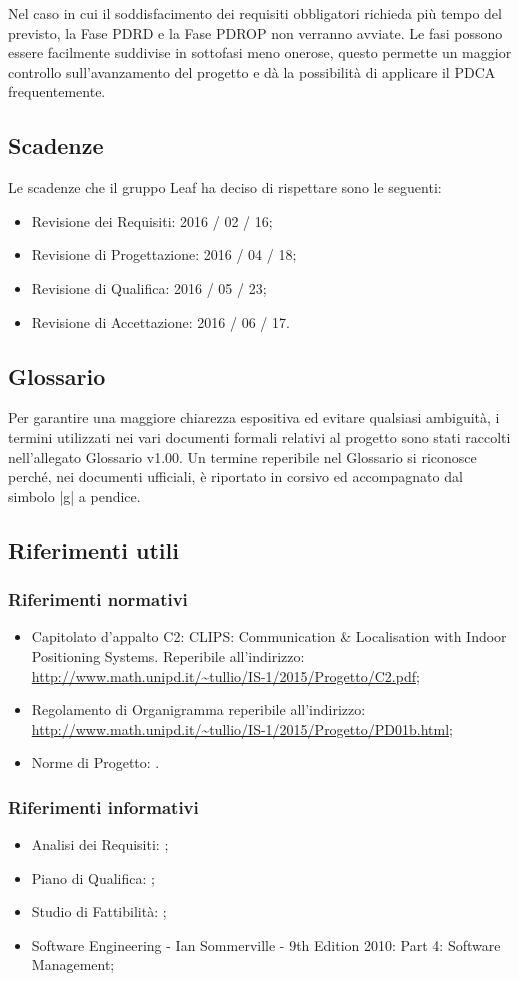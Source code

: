 \documentclass[../PianoProgetto.tex]{subfiles}
\begin{document}
		Nel caso in cui il soddisfacimento dei requisiti obbligatori richieda più tempo del previsto, la Fase PDRD e la Fase PDROP non verranno avviate.
		Le fasi possono essere facilmente suddivise in sottofasi meno onerose, questo permette un maggior controllo sull’avanzamento del progetto e dà la possibilità di applicare il PDCA frequentemente.

	\subsection{Scadenze}
		Le scadenze che il gruppo Leaf  ha deciso di rispettare sono le seguenti:
		\begin{itemize}
		\item Revisione dei Requisiti: 2016 / 02 / 16;
		\item Revisione di Progettazione: 2016 / 04 / 18;
		\item Revisione di Qualifica: 2016 / 05 / 23;
		\item Revisione di Accettazione: 2016 / 06 / 17.
		\end{itemize}


	\subsection{Glossario}
		Per garantire una maggiore chiarezza espositiva ed evitare qualsiasi ambiguità, i termini utilizzati nei vari documenti formali relativi al progetto sono stati raccolti nell’allegato Glossario v1.00. 
		Un termine reperibile nel Glossario si riconosce perché, nei documenti ufficiali, è riportato in corsivo ed accompagnato dal simbolo |g| a pendice.


	\subsection{Riferimenti utili}

		\subsubsection{Riferimenti normativi}
		\begin{itemize}
		\item Capitolato d’appalto C2: CLIPS: Communication \& Localisation with Indoor Positioning Systems. Reperibile all’indirizzo: \url{http://www.math.unipd.it/~tullio/IS-1/2015/Progetto/C2.pdf};
		\item Regolamento di Organigramma reperibile all’indirizzo: \url{http://www.math.unipd.it/~tullio/IS-1/2015/Progetto/PD01b.html};
		\item Norme di Progetto: .
		\end{itemize}

		\subsubsection{Riferimenti informativi}
		\begin{itemize}
		\item Analisi dei Requisiti: ;
		\item Piano di Qualifica: ;
		\item Studio di Fattibilità: ;
		\item Software Engineering - Ian Sommerville - 9th Edition 2010:  Part 4: Software Management;
		\end{itemize}
			
\end{document}

